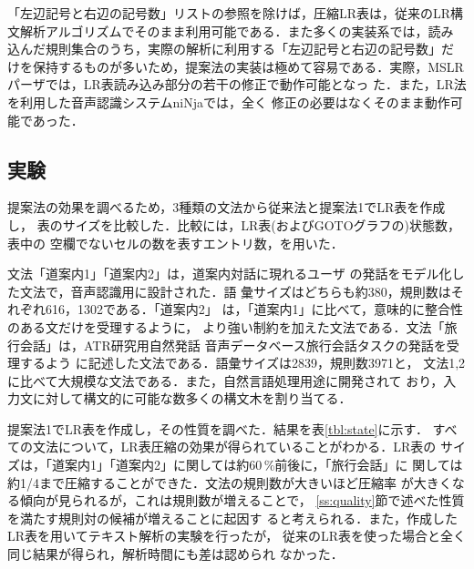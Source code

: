 「左辺記号と右辺の記号数」リストの参照を除けば，圧縮LR表は，従来のLR構
文解析アルゴリズムでそのまま利用可能である．また多くの実装系では，読み
込んだ規則集合のうち，実際の解析に利用する「左辺記号と右辺の記号数」だ
けを保持するものが多いため，提案法の実装は極めて容易である．実際，MSLR
パーザ\cite{mslr1998}では，LR表読み込み部分の若干の修正で動作可能となっ
た．また，LR法を利用した音声認識システムniNja\cite{itou1992}では，全く
修正の必要はなくそのまま動作可能であった．

\subsection{実験}
\label{sec:exp1}

提案法の効果を調べるため，3種類の文法から従来法と提案法1でLR表を作成し，
表のサイズを比較した．比較には，LR表(およびGOTOグラフの)状態数，表中の
空欄でないセルの数を表すエントリ数，を用いた．

文法「道案内1」「道案内2」は，道案内対話\cite{itou1999}に現れるユーザ
の発話をモデル化した文法で，音声認識用に設計された\cite{akiba2001}．語
彙サイズはどちらも約380，規則数はそれぞれ616，1302である．「道案内2」
は，「道案内1」に比べて，意味的に整合性のある文だけを受理するように，
より強い制約を加えた文法である．文法「旅行会話」は，ATR研究用自然発話
音声データベース\cite{morimoto1994}旅行会話タスクの発話を受理するよう
に記述した文法である\cite{imai1999}．語彙サイズは2839，規則数3971と，
文法1,2に比べて大規模な文法である．また，自然言語処理用途に開発されて
おり，入力文に対して構文的に可能な数多くの構文木を割り当てる．

提案法1でLR表を作成し，その性質を調べた．結果を表\ref{tbl:state}に示す．
すべての文法について，LR表圧縮の効果が得られていることがわかる．LR表の
サイズは，「道案内1」「道案内2」に関しては約60\,\%前後に，「旅行会話」に
関しては約1/4まで圧縮することができた．文法の規則数が大きいほど圧縮率
が大きくなる傾向が見られるが，これは規則数が増えることで，
\ref{ss:quality}節で述べた性質を満たす規則対の候補が増えることに起因す
ると考えられる．また，作成したLR表を用いてテキスト解析の実験を行ったが，
従来のLR表を使った場合と全く同じ結果が得られ，解析時間にも差は認められ
なかった．


